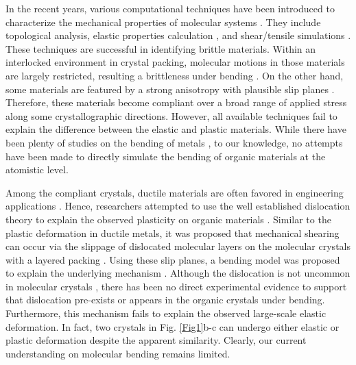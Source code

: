 \documentclass[prb,superscriptaddress,longbibliography, twocolumn]{revtex4-1}
\begin{document}
In the recent years, various computational techniques have been introduced to characterize the mechanical properties of molecular systems \cite{devarapalli2019remarkably, wang2018identifying, wang2019computational, wang2020landscape, ootani2022density, matveychuk2022quantitative}. They include topological analysis, elastic properties calculation \cite{wang2019computational}, and shear/tensile simulations \cite{devarapalli2019remarkably, ootani2022density}. These techniques are successful in identifying brittle materials. Within an interlocked environment in crystal packing, molecular motions in those materials are largely restricted, resulting a brittleness under bending \cite{wang2019computational}. On the other hand, some materials are featured by a strong anisotropy with plausible slip planes \cite{wang2019computational, bryant2018predicting}. Therefore, these materials become compliant over a broad range of applied stress along some crystallographic directions. However, all available techniques fail to explain the difference between the elastic and plastic materials. While there have been plenty of studies on the bending of metals \cite{ZHU20127112, Zhang_2014, NOHRING2016140, ZHUO2018331, KATAKAM2020106674, HE20223687}, to our knowledge, no attempts have been made to directly simulate the bending of organic materials at the atomistic level. 


Among the compliant crystals, ductile materials are often favored in engineering applications \cite{sun2017microstructure}. Hence, researchers attempted to use the well established dislocation theory to explain the observed plasticity on organic materials \cite{reddy2006structure, saha2018molecules}. Similar to the plastic deformation in ductile metals, it was proposed that mechanical shearing can occur via the slippage of dislocated molecular layers on the molecular crystals with a layered packing \cite{reddy2010mechanical, wang2018identifying}. Using these slip planes, a bending model was proposed to explain the underlying mechanism \cite{reddy2005structural}. Although the dislocation is not uncommon in molecular crystals \cite{mathew2013peierls, mathew2013slip, olson2018dislocations}, there has been no direct experimental evidence to support that dislocation pre-exists or appears in the organic crystals under bending. Furthermore, this mechanism fails to explain the observed large-scale elastic deformation. In fact, two crystals in Fig. \ref{Fig1}b-c can undergo either elastic or plastic deformation despite the apparent similarity. Clearly, our current understanding on molecular bending remains limited. 
\end{document}
